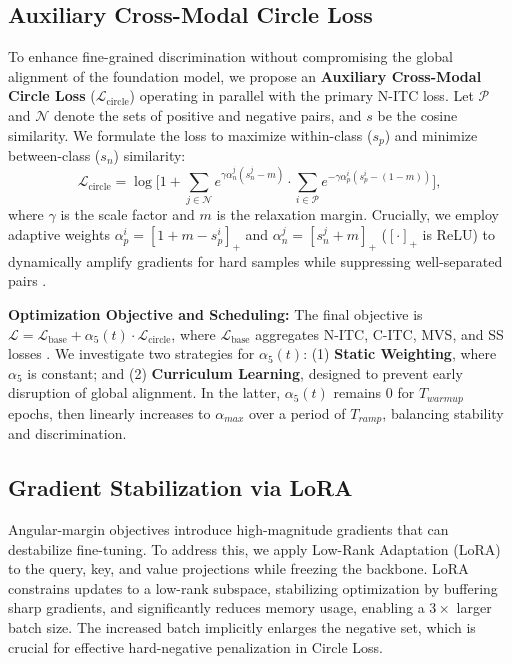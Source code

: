 \documentclass[conference]{IEEEtran}
\begin{document}
\subsection{Auxiliary Cross-Modal Circle Loss}
To enhance fine-grained discrimination without compromising the global alignment of the foundation model, we propose an \textbf{Auxiliary Cross-Modal Circle Loss} ($\mathcal{L}_{\text{circle}}$) operating in parallel with the primary N-ITC loss. Let $\mathcal{P}$ and $\mathcal{N}$ denote the sets of positive and negative pairs, and $s$ be the cosine similarity. We formulate the loss to maximize within-class ($s_p$) and minimize between-class ($s_n$) similarity:
\begin{equation}
\mathcal{L}_{\text{circle}} = \log \Bigg[ 1 + \sum_{j \in \mathcal{N}} e^{\gamma \alpha_n^j (s_n^j - m)} \cdot \sum_{i \in \mathcal{P}} e^{-\gamma \alpha_p^i (s_p^i - (1-m))} \Bigg],
\end{equation}
where $\gamma$ is the scale factor and $m$ is the relaxation margin. Crucially, we employ adaptive weights $\alpha_p^i = [1 + m - s_p^i]_+$ and $\alpha_n^j = [s_n^j + m]_+$ ($[\cdot]_+$ is ReLU) to dynamically amplify gradients for hard samples while suppressing well-separated pairs \cite{sun2020circle}.

\textbf{Optimization Objective and Scheduling:} The final objective is $\mathcal{L} = \mathcal{L}_{\text{base}} + \alpha_5(t) \cdot \mathcal{L}_{\text{circle}}$, where $\mathcal{L}_{\text{base}}$ aggregates N-ITC, C-ITC, MVS, and SS losses \cite{tran2025multilingual}. We investigate two strategies for $\alpha_5(t)$: (1) \textbf{Static Weighting}, where $\alpha_5$ is constant; and (2) \textbf{Curriculum Learning}, designed to prevent early disruption of global alignment. In the latter, $\alpha_5(t)$ remains 0 for $T_{warmup}$ epochs, then linearly increases to $\alpha_{max}$ over a period of $T_{ramp}$, balancing stability and discrimination.

\subsection{Gradient Stabilization via LoRA}
Angular-margin objectives introduce high-magnitude gradients that can destabilize fine-tuning. To address this, we apply Low-Rank Adaptation (LoRA) to the query, key, and value projections while freezing the backbone. LoRA constrains updates to a low-rank subspace, stabilizing optimization by buffering sharp gradients, and significantly reduces memory usage, enabling a $3\times$ larger batch size. The increased batch implicitly enlarges the negative set, which is crucial for effective hard-negative penalization in Circle Loss. 
\end{document}
